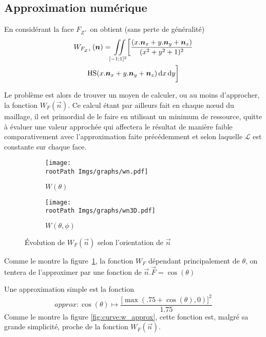 \documentclass[10pt,a4paper,twoside, twocolumn]{report}
\newcommand*{\rootPath}{../}
\begin{document}
\subsection{Approximation numérique}


En considérant la face $F_{Z^+}$ on obtient (sans perte de généralité)
\begin{multline}
	W_{F_{Z^+}}(\vec n) = \iint\limits_{[-1;1]^2} \biggl[\frac{(x.\vec n_x+y.\vec n_y + \vec n_z)}{(x^2+y^2+1)^2} \\
	\Hs(x.\vec n_x+y.\vec n_y + \vec n_z)\, \mathrm dx\, \mathrm dy\biggr]
\end{multline}

Le problème est alors de trouver un moyen de calculer, ou au moins d’approcher, la fonction $W_F(\vec n)$. Ce calcul étant par ailleurs fait  en chaque nœud du maillage, il est primordial de le faire en utilisant un minimum de ressource, quitte à évaluer une valeur approchée qui affectera le résultat de manière faible comparativement avec l’approximation faite précédemment et selon laquelle $\mathcal L$ est constante sur chaque face.

\begin{figure}[!ht]\centering
	\begin{subfigure}[b]{0.4\textwidth}\centering
		\texttt{[image: \\rootPath Imgs/graphs/wn.pdf]}
		\caption{$W(\theta)$}
	\end{subfigure}
	\begin{subfigure}[b]{0.4\textwidth}\centering
		\texttt{[image: \\rootPath Imgs/graphs/wn3D.pdf]}
		\caption{$W(\theta,\phi)$}
	\end{subfigure}

	\caption{Évolution de $W_F(\vec n)$ selon l’orientation de $\vec n$ }
	\label{fig:curve:w_theta_phi}
\end{figure}

Comme le montre la figure~\ref{fig:curve:w_theta_phi}, la fonction $W_F$ dépendant principalement de $\theta$, on tentera de l’approximer par une fonction de $\vec n.\vec F = \cos(\theta)$

Une approximation simple est la fonction
\begin{equation}
	approx : \cos(\theta)\mapsto
	\frac{\bigl[\max\left(.75 + \cos(\theta), 0\right)\bigr]^2}{1.75}
\end{equation}
Comme le montre la figure \ref{fig:curve:w_approx}, cette fonction est, malgré sa grande simplicité, proche de la fonction $W_F(\vec n)$.
\end{document}
